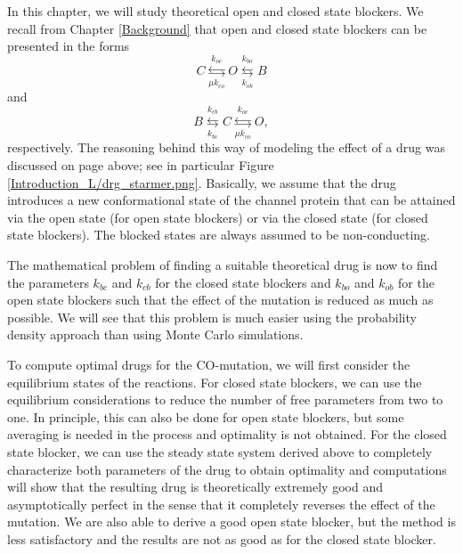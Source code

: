 In this chapter, we will study theoretical open and closed state blockers. We recall from Chapter \ref{Background} that open and closed state blockers can be presented in the forms 
\begin{equation}
C\underset{ \mu k_{co}}{\overset{k_{oc}}{\leftrightarrows}}O\underset{k_{ob}%
}{\overset{k_{bo}}{\leftrightarrows}}B \label{open_block2}
\end{equation}
and
\begin{equation}
B\underset{k_{bc}}{\overset{k_{cb}}{\leftrightarrows}}C\underset{
\mu k_{co}}{\overset{k_{oc}}{\leftrightarrows}}O, \label{closed_block2}
\end{equation}
respectively.  The reasoning behind this way of modeling the effect of a drug was discussed on page \pageref{theoreticaldrugs} above; see in particular Figure \ref{Introduction_L/drg_starmer.png}. Basically, we assume that the drug introduces a new conformational state of the channel protein that can be attained via the open state (for open state blockers) or via the closed state (for closed state blockers). The blocked states are always assumed to be non-conducting.

The mathematical problem of finding a suitable theoretical drug is now to find the parameters $ k_{bc}$ and $k_{cb}$ for the closed state blockers and $ k_{bo}$ and $k_{ob}$ for the open state blockers such that the effect of the mutation is reduced as much as possible. We will see that this problem is much easier using the probability density approach than using Monte Carlo simulations. 

To compute optimal drugs for the CO-mutation, we will first consider the equilibrium states of the reactions. For closed state blockers, we can use the equilibrium considerations to reduce the number of free parameters from two to one. In principle, this can also be done for open state blockers, but some averaging is needed in the process and optimality is not obtained. For the closed state blocker, we can use the steady state system derived above to completely characterize both parameters of the drug to obtain optimality and computations will show that the resulting drug is theoretically extremely good and asymptotically perfect in the sense that it completely reverses the effect of the mutation. We are also able to derive a good open state blocker, but the method is less satisfactory and the results are not as good as for the closed state blocker.



